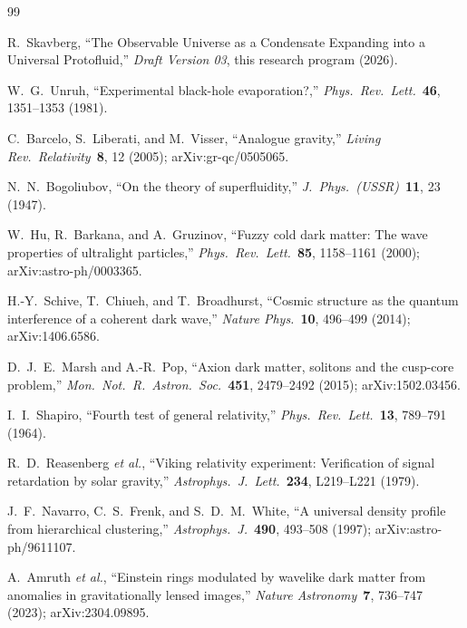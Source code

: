 \documentclass[11pt,a4paper]{article}
\theoremstyle{definition}
\theoremstyle{remark}
\begin{document}
\begin{thebibliography}{99}

R.~Skavberg, ``The Observable Universe as a Condensate Expanding into a Universal Protofluid,''
\emph{Draft Version 03}, this research program (2026).


W.~G.~Unruh, ``Experimental black-hole evaporation?,''
\emph{Phys.\ Rev.\ Lett.}\ \textbf{46}, 1351--1353 (1981).

C.~Barcelo, S.~Liberati, and M.~Visser, ``Analogue gravity,''
\emph{Living Rev.\ Relativity}\ \textbf{8}, 12 (2005);
arXiv:gr-qc/0505065.

N.~N.~Bogoliubov, ``On the theory of superfluidity,''
\emph{J.\ Phys.\ (USSR)}\ \textbf{11}, 23 (1947).


W.~Hu, R.~Barkana, and A.~Gruzinov,
``Fuzzy cold dark matter: The wave properties of ultralight particles,''
\emph{Phys.\ Rev.\ Lett.}\ \textbf{85}, 1158--1161 (2000);
arXiv:astro-ph/0003365.

H.-Y.~Schive, T.~Chiueh, and T.~Broadhurst,
``Cosmic structure as the quantum interference of a coherent dark wave,''
\emph{Nature Phys.}\ \textbf{10}, 496--499 (2014);
arXiv:1406.6586.

D.~J.~E.~Marsh and A.-R.~Pop,
``Axion dark matter, solitons and the cusp-core problem,''
\emph{Mon.\ Not.\ R.\ Astron.\ Soc.}\ \textbf{451}, 2479--2492 (2015);
arXiv:1502.03456.


I.~I.~Shapiro, ``Fourth test of general relativity,''
\emph{Phys.\ Rev.\ Lett.}\ \textbf{13}, 789--791 (1964).

R.~D.~Reasenberg \emph{et al.}, ``Viking relativity experiment: Verification of signal retardation by solar gravity,''
\emph{Astrophys.\ J.\ Lett.}\ \textbf{234}, L219--L221 (1979).

J.~F.~Navarro, C.~S.~Frenk, and S.~D.~M.~White,
``A universal density profile from hierarchical clustering,''
\emph{Astrophys.\ J.}\ \textbf{490}, 493--508 (1997);
arXiv:astro-ph/9611107.

A.~Amruth \emph{et al.},
``Einstein rings modulated by wavelike dark matter from anomalies in gravitationally lensed images,''
\emph{Nature Astronomy}\ \textbf{7}, 736--747 (2023);
arXiv:2304.09895.


\end{thebibliography}
\end{document}
